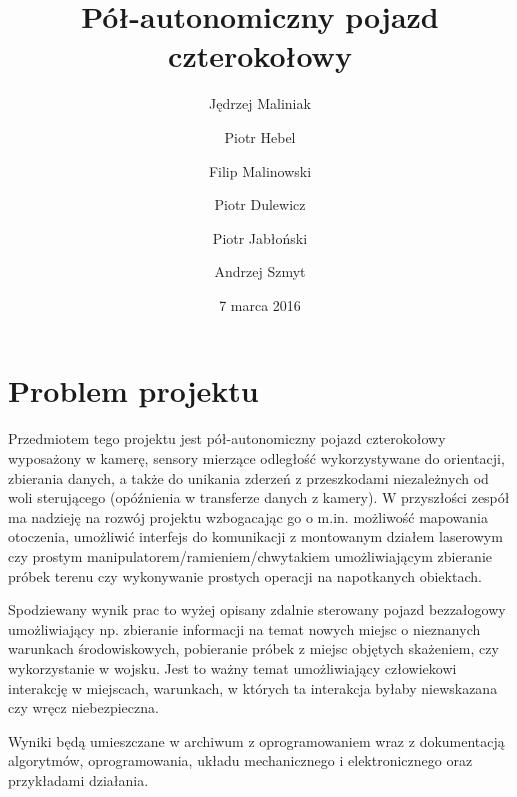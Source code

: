 \documentclass[a4paper]{article}
\title{Pół-autonomiczny pojazd czterokołowy}
\author{Jędrzej Maliniak \and Piotr Hebel \and Filip Malinowski \and Piotr Dulewicz \and Piotr Jabłoński \and Andrzej Szmyt}
\date{7 marca 2016}
\begin{document}
\maketitle

\section{Problem projektu}
    Przedmiotem tego projektu jest pół-autonomiczny pojazd czterokołowy wyposażony w kamerę, sensory mierzące odległość wykorzystywane do orientacji, zbierania danych, a także do unikania zderzeń z przeszkodami niezależnych od woli sterującego (opóźnienia w transferze danych z kamery). W przyszłości zespół ma nadzieję na rozwój projektu wzbogacając go o m.in. możliwość mapowania otoczenia, umożliwić interfejs do komunikacji z montowanym działem laserowym czy prostym manipulatorem/ramieniem/chwytakiem umożliwiającym zbieranie próbek terenu czy wykonywanie prostych operacji na napotkanych obiektach.
    
    Spodziewany wynik prac to wyżej opisany zdalnie sterowany pojazd bezzałogowy umożliwiający np. zbieranie informacji na temat nowych miejsc o nieznanych warunkach środowiskowych, pobieranie próbek z miejsc objętych skażeniem, czy wykorzystanie w wojsku. Jest to ważny temat umożliwiający człowiekowi interakcję w miejscach, warunkach, w których ta interakcja byłaby niewskazana czy wręcz niebezpieczna. 

    Wyniki będą umieszczane w archiwum z oprogramowaniem wraz z dokumentacją algorytmów, oprogramowania, układu mechanicznego i elektronicznego oraz przykładami działania.
\end{document}
